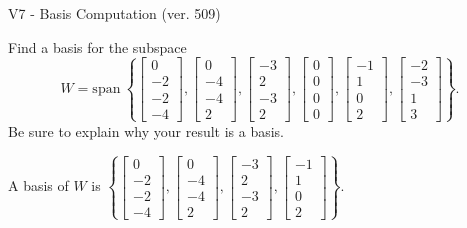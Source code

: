 \begin{exercise}
  \begin{exerciseTitle}V7 - Basis Computation (ver. 509)\end{exerciseTitle}
  \begin{exerciseStatement}
    Find a basis for the subspace 
\[W=\mathrm{span}\ \left\{\left[\begin{array}{r}
0 \\
-2 \\
-2 \\
-4
\end{array}\right] , \left[\begin{array}{r}
0 \\
-4 \\
-4 \\
2
\end{array}\right] , \left[\begin{array}{r}
-3 \\
2 \\
-3 \\
2
\end{array}\right] , \left[\begin{array}{r}
0 \\
0 \\
0 \\
0
\end{array}\right] , \left[\begin{array}{r}
-1 \\
1 \\
0 \\
2
\end{array}\right] , \left[\begin{array}{r}
-2 \\
-3 \\
1 \\
3
\end{array}\right]\right\}.\]
 Be sure to explain why your result is a basis.


  \end{exerciseStatement}
  \begin{exerciseAnswer}
   A basis of \(W\) is  \(\left\{\left[\begin{array}{r}
0 \\
-2 \\
-2 \\
-4
\end{array}\right] , \left[\begin{array}{r}
0 \\
-4 \\
-4 \\
2
\end{array}\right] , \left[\begin{array}{r}
-3 \\
2 \\
-3 \\
2
\end{array}\right] , \left[\begin{array}{r}
-1 \\
1 \\
0 \\
2
\end{array}\right]\right\}\).
  


  \end{exerciseAnswer}
\end{exercise}